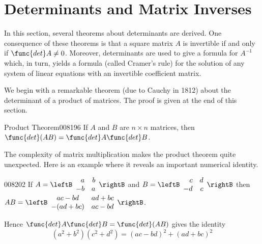 \section{Determinants and Matrix Inverses}
\label{sec:3_2}

In this section, several theorems about determinants are derived. One consequence of these theorems is that a square matrix $A$ is invertible if and only if $\func{det } A \neq 0$. Moreover, determinants are used to give a formula for $A^{-1}$
 which, in turn, yields a formula (called Cramer's rule) for the 
solution of any system of linear equations with an invertible 
coefficient matrix.

We begin with a remarkable theorem (due
 to Cauchy in 1812) about the determinant of a product of matrices. The 
proof is given at the end of this section.

\begin{theorem}{Product Theorem}{008196}
If $A$ and $B$ are $n \times n$ matrices, then $\func{det}(AB) = \func{det } A \func{det } B$.
\end{theorem}

The complexity of matrix multiplication
 makes the product theorem quite unexpected. Here is an example where it
 reveals an important numerical identity.


\begin{example}{}{008202}
If $A = \leftB \begin{array}{rr} 
a & b \\
-b & a 
\end{array} \rightB$ and $B = \leftB \begin{array}{rr} 
c & d \\
-d & c 
\end{array} \rightB$
then $AB = \leftB \begin{array}{cc} 
ac-bd & ad+bc \\
-(ad+bc) & ac-bd 
\end{array} \rightB$.

\medskip

Hence $\func{det } A \func{det } B = \func{det}(AB)$ gives the identity
\begin{equation*}
(a^2 + b^2)(c^2+d^2) = (ac-bd)^2 + (ad+bc)^2
\end{equation*}
\end{example}

